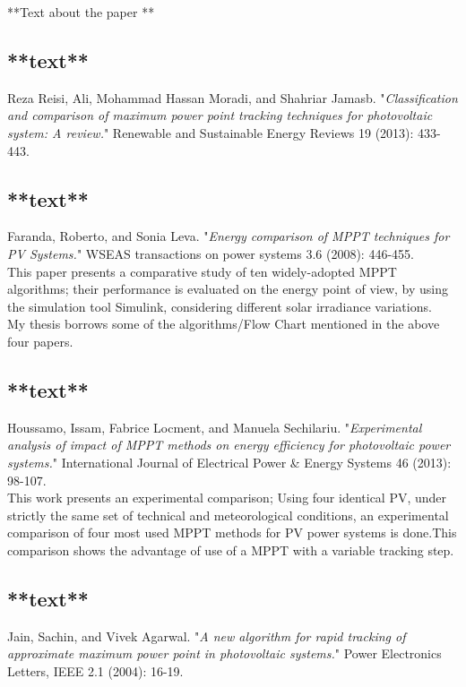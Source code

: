 {**Text about the paper **

\subsection{**text**\cite{reza2013classification}}

Reza Reisi, Ali, Mohammad Hassan Moradi, and Shahriar Jamasb. "\textit{Classification and comparison of maximum power point tracking techniques for photovoltaic system: A review.}" Renewable and Sustainable Energy Reviews 19 (2013): 433-443.

\subsection{**text**\cite{faranda2008energy}}

Faranda, Roberto, and Sonia Leva. "\textit{Energy comparison of MPPT techniques for PV Systems.}" WSEAS transactions on power systems 3.6 (2008): 446-455.\\

This paper presents a comparative study of ten widely-adopted MPPT algorithms; their performance is evaluated on the energy point of view, by using the simulation tool Simulink{\textregistered}, considering different solar irradiance variations.\\

My thesis borrows some of the algorithms/Flow Chart mentioned in the above four papers. 

\subsection{**text**\cite{houssamo2013experimental}}

Houssamo, Issam, Fabrice Locment, and Manuela Sechilariu. "\textit{Experimental analysis of impact of MPPT methods on energy efficiency for photovoltaic power systems.}" International Journal of Electrical Power \& Energy Systems 46 (2013): 98-107.\\

This work presents an experimental comparison; Using four identical PV, under strictly the same set of technical and meteorological conditions, an experimental comparison  of four most used MPPT methods for PV power systems is done.This comparison shows the advantage of use of a MPPT with a variable tracking step.\\  

\subsection{**text**\cite{jain2004new}}
Jain, Sachin, and Vivek Agarwal. "\textit{A new algorithm for rapid tracking of approximate maximum power point in photovoltaic systems.}" Power Electronics Letters, IEEE 2.1 (2004): 16-19.\\

}
